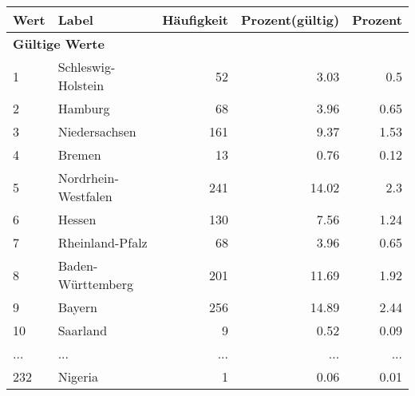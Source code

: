      \begin{longtable}{lXrrr}
     \toprule
     \textbf{Wert} & \textbf{Label} & \textbf{Häufigkeit} & \textbf{Prozent(gültig)} & \textbf{Prozent} \\
     \endhead
     \midrule
     \multicolumn{5}{l}{\textbf{Gültige Werte}}\\
        1 & \multicolumn{1}{X}{Schleswig-Holstein} & %
          \num{52} &
          \num[round-mode=places,round-precision=2]{3,03} &
          \num[round-mode=places,round-precision=2]{0,5} \\
        2 & \multicolumn{1}{X}{Hamburg} & %
          \num{68} &
          \num[round-mode=places,round-precision=2]{3,96} &
          \num[round-mode=places,round-precision=2]{0,65} \\
        3 & \multicolumn{1}{X}{Niedersachsen} & %
          \num{161} &
          \num[round-mode=places,round-precision=2]{9,37} &
          \num[round-mode=places,round-precision=2]{1,53} \\
        4 & \multicolumn{1}{X}{Bremen} & %
          \num{13} &
          \num[round-mode=places,round-precision=2]{0,76} &
          \num[round-mode=places,round-precision=2]{0,12} \\
        5 & \multicolumn{1}{X}{Nordrhein-Westfalen} & %
          \num{241} &
          \num[round-mode=places,round-precision=2]{14,02} &
          \num[round-mode=places,round-precision=2]{2,3} \\
        6 & \multicolumn{1}{X}{Hessen} & %
          \num{130} &
          \num[round-mode=places,round-precision=2]{7,56} &
          \num[round-mode=places,round-precision=2]{1,24} \\
        7 & \multicolumn{1}{X}{Rheinland-Pfalz} & %
          \num{68} &
          \num[round-mode=places,round-precision=2]{3,96} &
          \num[round-mode=places,round-precision=2]{0,65} \\
        8 & \multicolumn{1}{X}{Baden-Württemberg} & %
          \num{201} &
          \num[round-mode=places,round-precision=2]{11,69} &
          \num[round-mode=places,round-precision=2]{1,92} \\
        9 & \multicolumn{1}{X}{Bayern} & %
          \num{256} &
          \num[round-mode=places,round-precision=2]{14,89} &
          \num[round-mode=places,round-precision=2]{2,44} \\
        10 & \multicolumn{1}{X}{Saarland} & %
          \num{9} &
          \num[round-mode=places,round-precision=2]{0,52} &
          \num[round-mode=places,round-precision=2]{0,09} \\
       ... & ... & ... & ... & ... \\
        232 & \multicolumn{1}{X}{Nigeria} & %
          \num{1} &
          \num[round-mode=places,round-precision=2]{0,06} &
          \num[round-mode=places,round-precision=2]{0,01} \\


\end{longtable}

